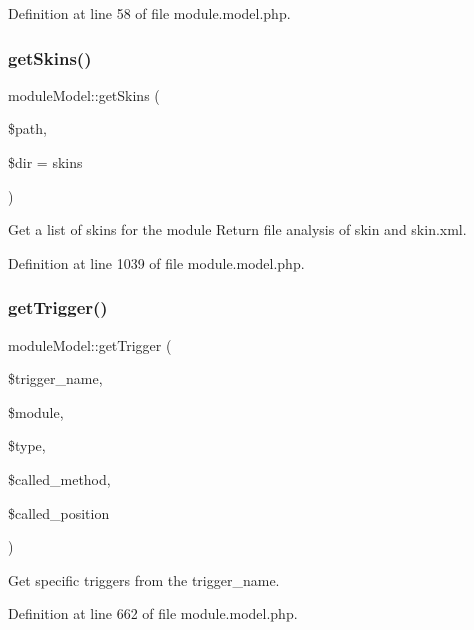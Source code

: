 Definition at line 58 of file module.\+model.\+php.

\hypertarget{classmoduleModel_abe2d53bb2e98a672c0a776537d7471cf}{}\label{classmoduleModel_abe2d53bb2e98a672c0a776537d7471cf} 
\subsubsection{\texorpdfstring{get\+Skins()}{getSkins()}}
{\footnotesize\ttfamily module\+Model\+::get\+Skins (\begin{DoxyParamCaption}\item[{}]{\$path,  }\item[{}]{\$dir = {\ttfamily \textquotesingle{}skins\textquotesingle{}} }\end{DoxyParamCaption})}



Get a list of skins for the module Return file analysis of skin and skin.\+xml. 



Definition at line 1039 of file module.\+model.\+php.

\hypertarget{classmoduleModel_ae570716b47c7fd19b7fc0d217a155b22}{}\label{classmoduleModel_ae570716b47c7fd19b7fc0d217a155b22} 
\subsubsection{\texorpdfstring{get\+Trigger()}{getTrigger()}}
{\footnotesize\ttfamily module\+Model\+::get\+Trigger (\begin{DoxyParamCaption}\item[{}]{\$trigger\+\_\+name,  }\item[{}]{\$module,  }\item[{}]{\$type,  }\item[{}]{\$called\+\_\+method,  }\item[{}]{\$called\+\_\+position }\end{DoxyParamCaption})}



Get specific triggers from the trigger\+\_\+name. 



Definition at line 662 of file module.\+model.\+php.

\hypertarget{classmoduleModel_a979238a3b59bf52ccaa29ec3f7744808}{}\label{classmoduleModel_a979238a3b59bf52ccaa29ec3f7744808} 
